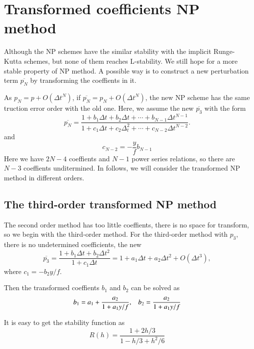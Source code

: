 \documentclass[review]{elsarticle}
\theoremstyle{plain}\newtheorem{definition}{\sc{Definition}}
\theoremstyle{defination}\newtheorem{example}{Example}[section]
\numberwithin{equation}{section}
\numberwithin{table}{section}
\begin{document}
{\section{Transformed coefficients NP method}  
Although the NP schemes have  the similar stability with the implicit Runge-Kutta schemes, but none of them reaches L-stability. We still hope for a more stable property of NP method.     
A possible way is  to construct a new perturbation term $\overline{p_N}$ by  transforming  the coeffients in it.

As $p_N = p + O(\Delta t^{N})$, if $\overline{p_N}= p_N + O(\Delta t^{N})$, the new NP scheme has the same truction error order with the old one. Here, we  assume the new $\overline{p_3}$ with the form
\begin{equation}
  \overline{p_N} = \frac{ 1+ b_1 \Delta t+  b_2\Delta t +\cdots +b_{N-1}\Delta t^{N-1}}{1+c_1\Delta t +c_2\Delta_t^2 +\cdots+ c_{N-2}\Delta t^{N-2}}.
  \end{equation}
and 
\begin{equation}
  c_{N-2}=-\frac{y}{f}b_{N-1}
  \end{equation}
  Here we have $2N-4$ coeffients and $N-1$  power series relations, so there are $N-3$ coeffients unditermined. In follows, we will consider the  transformed  NP method in different orders.    

  \subsection{ The third-order transformed NP method}
The second order method  has too little coeffients, there is no space for transform, so we begin with the third-order method. For the third-order method with $p_3$, there is no  undetermined coefficients,  the new 
\begin{equation}
\overline{p_3} =
\frac{ 1+ b_1 \Delta t+ b_2\Delta t^2}{1+c_1 \Delta t} = 1+a_1\Delta t +a_2 \Delta t^2 + O(\Delta t^3),
\end{equation}
where $c_1=-b_2 y/f$.

Then the transformed coeffients $b_1$ and $b_2$ can be solved as
\begin{equation}
  b_1= a_1+ \frac{a_2}{1+a_1y/f},\hspace{0.3cm}  b_2=\frac{a_2}{1+a_1y/f}
\end{equation}

It is easy to get the stability function as 
\begin{equation}
  R(h) = \frac{1+2h/3}{1-h/3+h^2/6}
\end{equation}

}
\end{document}
